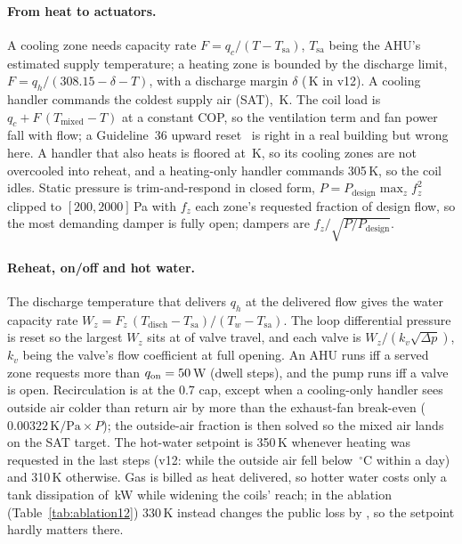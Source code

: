 \documentclass{article}
\begin{document}
\paragraph{From heat to actuators.} A cooling zone needs capacity rate $F = q_c/(T - T_{\text{sa}})$, $T_{\text{sa}}$ being the AHU's estimated supply temperature; a heating zone is bounded by the discharge limit, $F = q_h/(308.15 - \delta - T)$, with a discharge margin $\delta$ (\ParDischMarginK\,K in v12). A cooling handler commands the coldest supply air (SAT), \ParSatCoolHi\,K. The coil load is $q_c + F\,(T_{\text{mixed}} - T)$ at a constant COP, so the ventilation term and fan power fall with flow; a Guideline~36 upward reset~\citep{ashrae2021g36,taylor2018vav} is right in a real building but wrong here. A handler that also heats is floored at \ParSatMixFloor\,K, so its cooling zones are not overcooled into reheat, and a heating-only handler commands 305\,K, so the coil idles. Static pressure is trim-and-respond in closed form, $P = P_{\text{design}}\max_z f_z^2$ clipped to $[200, 2000]$\,Pa with $f_z$ each zone's requested fraction of design flow, so the most demanding damper is fully open; dampers are $f_z/\sqrt{P/P_{\text{design}}}$.

\paragraph{Reheat, on/off and hot water.} The discharge temperature that delivers $q_h$ at the delivered flow gives the water capacity rate $W_z = F_z\,(T_{\text{disch}} - T_{\text{sa}})/(T_w - T_{\text{sa}})$. The loop differential pressure is reset so the largest $W_z$ sits at \ParValveTarget{} of valve travel, and each valve is $W_z/(k_v \sqrt{\Delta p})$, $k_v$ being the valve's flow coefficient at full opening. An AHU runs iff a served zone requests more than $q_{\text{on}} = 50$\,W (dwell \ParMinOnSteps{} steps), and the pump runs iff a valve is open. Recirculation is at the 0.7 cap, except when a cooling-only handler sees outside air colder than return air by more than the exhaust-fan break-even ($0.00322\,\text{K/Pa}\times P$); the outside-air fraction is then solved so the mixed air lands on the SAT target. The hot-water setpoint is 350\,K whenever heating was requested in the last \ParHeatSeasonSteps{} steps (v12: \RTenSeasonSteps{} while the outside air fell below \RTenSeasonOatC\,$^\circ$C within a day) and 310\,K otherwise. Gas is billed as heat delivered, so hotter water costs only a tank dissipation of \TankLossExtraKw\,kW while widening the coils' reach; in the ablation (Table~\ref{tab:ablation12}) 330\,K instead changes the public loss by \RElvAbTwRel, so the setpoint hardly matters there.
\end{document}
